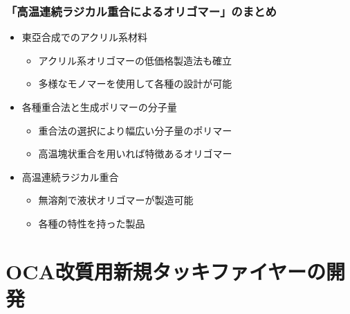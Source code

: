 \documentclass[unicode,12pt]{beamer}%
\begin{document}
\begin{frame}
	\frametitle{「高温連続ラジカル重合によるオリゴマー」のまとめ}
        \begin{boxnote}
            \vspace{-3mm}
            \begin{itemize}
                \item 東亞合成でのアクリル系材料
                    \begin{itemize}
                        \item アクリル系オリゴマーの低価格製造法も確立
                        \item 多様なモノマーを使用して各種の設計が可能
                    \end{itemize} 
                \item 各種重合法と生成ポリマーの分子量
                    \begin{itemize}
                        \item 重合法の選択により幅広い分子量のポリマー
                        \item 高温塊状重合を用いれば特徴あるオリゴマー
                    \end{itemize} 
                \item 高温連続ラジカル重合
                    \begin{itemize}
                        \item 無溶剤で液状オリゴマーが製造可能
                        \item 各種の特性を持った製品
                    \end{itemize}
            \end{itemize}
        \end{boxnote}
\end{frame}





\section{OCA改質用新規タッキファイヤーの開発}
\end{document}
